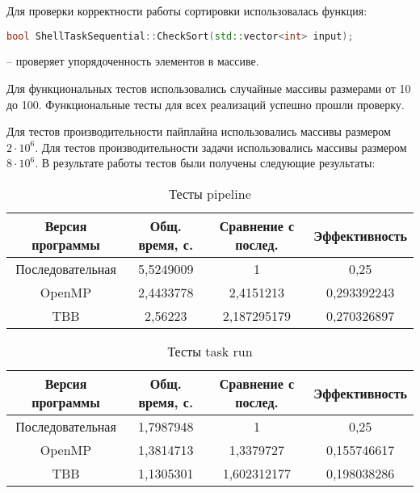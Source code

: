 \documentclass[]{article}
\theoremstyle{remark}
\theoremstyle{definition}
\begin{document}
\par Для проверки корректности работы сортировки использовалась функция:

\begin{lstlisting}[language=C++]
bool ShellTaskSequential::CheckSort(std::vector<int> input);
\end{lstlisting}
 -- проверяет упорядоченность элементов в массиве.
\par Для функциональных тестов использовались случайные массивы размерами от 10 до 100. Функциональные тесты для всех реализаций успешно прошли проверку.

\par Для тестов производительности пайплайна использовались массивы размером $2 \cdot 10^6$. Для тестов производительности задачи использовались массивы размером $8 \cdot 10^6$. В результате работы тестов были получены следующие результаты:

\begin{table}[h!]
    \begin{center}
        \begin{tabular}{ |c|c|c|c| } 
        \hline
        Версия программы & Общ. время, с. & Сравнение с послед. & Эффективность  \\
        \hline
        Последовательная & 5,5249009 & 1 & 0,25 \\
        OpenMP & 2,4433778 & 2,4151213 & 0,293392243 \\
        TBB & 2,56223 & 2,187295179 & 0,270326897 \\
        \hline
        \end{tabular}
    \end{center}
    \caption{Тесты pipeline}
\end{table}

\begin{table}[h]
    \begin{center}
        \begin{tabular}{ |c|c|c|c| } 
        \hline
        Версия программы & Общ. время, с. & Сравнение с послед. & Эффективность  \\
        \hline
        Последовательная & 1,7987948 & 1 & 0,25 \\
        OpenMP & 1,3814713 & 1,3379727 & 0,155746617 \\
        TBB & 1,1305301 & 1,602312177 & 0,198038286 \\
        \hline
        \end{tabular}
    \end{center}
    \caption{Тесты task run}
\end{table}
\end{document}
